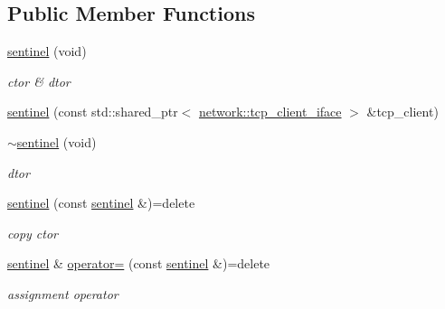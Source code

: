\subsection*{Public Member Functions}
\begin{DoxyCompactItemize}
\item 
\mbox{\hyperlink{classcpp__redis_1_1sentinel_a2ea5a80a9139d5192706988521a2ae34}{sentinel}} (void)
\begin{DoxyCompactList}\small\item\em ctor \& dtor \end{DoxyCompactList}\item 
\mbox{\hyperlink{classcpp__redis_1_1sentinel_af53665f5834dfe5861a6310318ae5169}{sentinel}} (const std\+::shared\+\_\+ptr$<$ \mbox{\hyperlink{classcpp__redis_1_1network_1_1tcp__client__iface}{network\+::tcp\+\_\+client\+\_\+iface}} $>$ \&tcp\+\_\+client)
\item 
\mbox{\label{classcpp__redis_1_1sentinel_af8535e89714db8ddcd7e74337ee5385a}} 
\mbox{\hyperlink{classcpp__redis_1_1sentinel_af8535e89714db8ddcd7e74337ee5385a}{$\sim$sentinel}} (void)
\begin{DoxyCompactList}\small\item\em dtor \end{DoxyCompactList}\item 
\mbox{\label{classcpp__redis_1_1sentinel_a4c3b68f6e930b2e9723816bb8bed5a8f}} 
\mbox{\hyperlink{classcpp__redis_1_1sentinel_a4c3b68f6e930b2e9723816bb8bed5a8f}{sentinel}} (const \mbox{\hyperlink{classcpp__redis_1_1sentinel}{sentinel}} \&)=delete
\begin{DoxyCompactList}\small\item\em copy ctor \end{DoxyCompactList}\item 
\mbox{\label{classcpp__redis_1_1sentinel_a06b8d049160e3990cdac3158aaf160a6}} 
\mbox{\hyperlink{classcpp__redis_1_1sentinel}{sentinel}} \& \mbox{\hyperlink{classcpp__redis_1_1sentinel_a06b8d049160e3990cdac3158aaf160a6}{operator=}} (const \mbox{\hyperlink{classcpp__redis_1_1sentinel}{sentinel}} \&)=delete
\begin{DoxyCompactList}\small\item\em assignment operator \end{DoxyCompactList}\item 

\end{DoxyCompactItemize}
